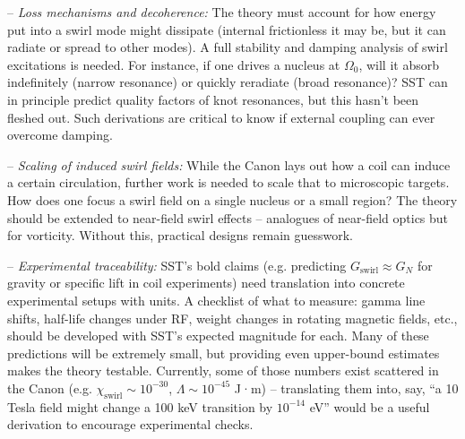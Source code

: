 \documentclass[11pt]{article}
\begin{document}
\begin{itemize}
– \textit{Loss mechanisms and decoherence:} The theory must account for how energy put into a swirl mode might dissipate (internal frictionless it may be, but it can radiate or spread to other modes). A full stability and damping analysis of swirl excitations is needed. For instance, if one drives a nucleus at $\Omega_0$, will it absorb indefinitely (narrow resonance) or quickly reradiate (broad resonance)? SST can in principle predict quality factors of knot resonances, but this hasn’t been fleshed out. Such derivations are critical to know if external coupling can ever overcome damping.

– \textit{Scaling of induced swirl fields:} While the Canon lays out how a coil can induce a certain circulation, further work is needed to scale that to microscopic targets. How does one focus a swirl field on a single nucleus or a small region? The theory should be extended to near-field swirl effects – analogues of near-field optics but for vorticity. Without this, practical designs remain guesswork.

– \textit{Experimental traceability:} SST’s bold claims (e.g. predicting $G_{\text{swirl}} \approx G_N$ for gravity or specific lift in coil experiments) need translation into concrete experimental setups with units. A checklist of what to measure: gamma line shifts, half-life changes under RF, weight changes in rotating magnetic fields, etc., should be developed with SST’s expected magnitude for each. Many of these predictions will be extremely small, but providing even upper-bound estimates makes the theory testable. Currently, some of those numbers exist scattered in the Canon (e.g. $\chi_{\text{swirl}}\sim10^{-30}$, $\Lambda\sim10^{-45}$ J·m) – translating them into, say, “a 10 Tesla field might change a 100 keV transition by $10^{-14}$ eV” would be a useful derivation to encourage experimental checks.




\end{itemize}
\end{document}
